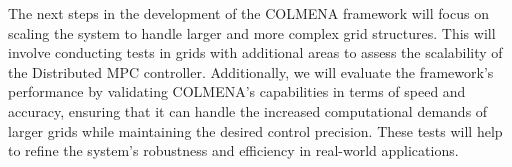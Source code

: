 \documentclass{article}
\begin{document}
The next steps in the development of the COLMENA framework will focus on scaling the system to handle larger and more complex grid structures. This will involve conducting tests in grids with additional areas to assess the scalability of the Distributed MPC controller. Additionally, we will evaluate the framework's performance by validating COLMENA's capabilities in terms of speed and accuracy, ensuring that it can handle the increased computational demands of larger grids while maintaining the desired control precision. These tests will help to refine the system's robustness and efficiency in real-world applications.

\newpage
\nocite{*}  
\printbibliography
\end{document}

